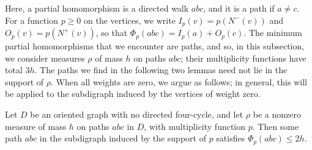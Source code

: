 Here, a partial homomorphism is a directed walk $abc$, and it is a path if $a\ne c$. For a function $p\ge0$ on the vertices, we write $I_p(v)=p(N^-(v))$ and $O_p(v)=p(N^+(v))$, so that $\Phi_p(abc)=I_p(a)+O_p(c)$.
The minimum partial homomorphisms that we encounter are paths, and so, in this subsection, we consider measures $\rho$ of mass $h$ on paths $abc$; their multiplicity functions have total $3h$.
The paths we find in the following two lemmas need not lie in the support of $\rho$.
When all weights are zero, we argue as follows; in general, this will be applied to the subdigraph induced by the vertices of weight zero.

\begin{lemma}\label{c4:lem:constant}
Let $D$ be an oriented graph with no directed four-cycle, and let $\rho$ be a nonzero measure of mass $h$ on paths $abc$ in $D$, with multiplicity function $p$. Then some path $abc$ in the subdigraph induced by the support of $p$ satisfies
$\Phi_p(abc)\le2h$.
\end{lemma}
